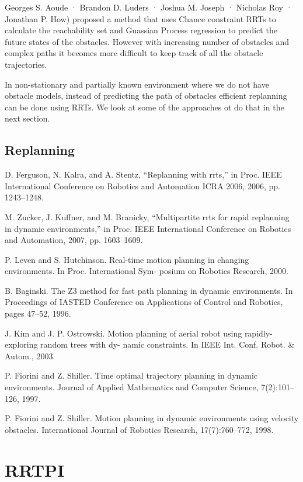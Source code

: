 \documentclass[MTech]{iitmdiss}
\begin{document}
Georges S. Aoude · Brandon D. Luders · Joshua M. Joseph · Nicholas Roy · Jonathan P. How) proposed a method that uses Chance constraint RRTs to calculate the reachability set and Guassian Process regression to predict the future states of the obstacles. However with increasing number of obstacles and complex paths it becomes more difficult to keep track of all the obstacle trajectories. 

In non-stationary and partially known environment where we do not have obstacle models, instead of predicting the path of obstacles efficient replanning can be done using RRTs. We look at some of the approaches ot do that in the next section.

 \section{Replanning}
 


 
D. Ferguson, N. Kalra, and A. Stentz, “Replanning with rrts,” in Proc. IEEE International Conference on Robotics and Automation ICRA 2006, 2006, pp. 1243–1248.

 M. Zucker, J. Kuffner, and M. Branicky, “Multipartite rrts for rapid replanning in dynamic environments,” in Proc. IEEE International Conference on Robotics and Automation, 2007, pp. 1603–1609. 
 
P. Leven and S. Hutchinson. Real-time motion planning in changing environments. In Proc. International Sym- posium on Robotics Research, 2000. 
 
 B. Baginski. The Z3 method for fast path planning in dynamic environments. In Proceedings of IASTED Conference on Applications of Control and Robotics, pages 47–52, 1996.
 
 J. Kim and J. P. Ostrowski. Motion planning of aerial robot using rapidly-exploring random trees with dy- namic constraints. In IEEE Int. Conf. Robot. $\&$ Autom., 2003.
 
P. Fiorini and Z. Shiller. Time optimal trajectory planning in dynamic environments. Journal of Applied Mathematics and Computer Science, 7(2):101–126, 1997.

P. Fiorini and Z. Shiller. Motion planning in dynamic environments using velocity obstacles. International Journal of Robotics Research, 17(7):760–772, 1998. 
 
 
\chapter{RRTPI}
\end{document}
